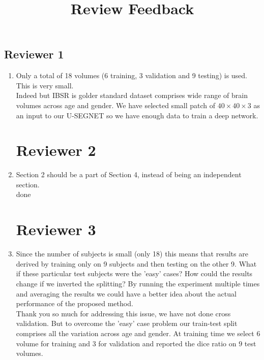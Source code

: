\documentclass{article}
\begin{document}
\title{Review Feedback}
\maketitle
\begin{center}
\section*{Reviewer 1}
\end{center}

\begin{enumerate}
\item Only a total of 18 volumes (6 training, 3 validation and 9 testing) is used. This is very small.
 \\

Indeed but IBSR is golder standard dataset comprises wide range of brain volumes across age and gender. We have selected small patch of $40 \times 40 \times 3$ as an input to our U-SEGNET so we have enough data to train a deep network.  

\begin{center}
\section*{Reviewer 2}
\end{center}


\item Section 2 should be a part of Section 4, instead of being an independent section.
 \\
done

\begin{center}
\section*{Reviewer 3}
\end{center}
\item Since the number of subjects is small (only 18) this means that results are derived by training only on 9 subjects and then testing on the other 9. What if these particular test subjects were the 'easy' cases? How could the results change if we inverted the splitting? By running the experiment multiple times and averaging the results we could have a better idea about the actual performance of the proposed method. \\

Thank you so much for addressing this issue, we have not done cross validation. But to overcome the 'easy' case problem our train-test split comprises all the variation across age and gender. At training time we select $6$ volume for training and $3$ for validation and reported the dice ratio on $9$ test volumes.


\end{enumerate}
\end{document}
